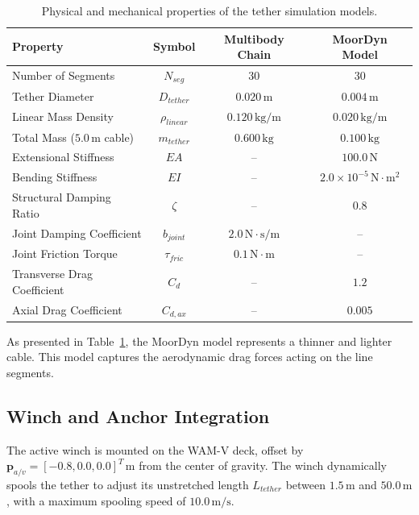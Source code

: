     \begin{table}[htbp]
        \centering
        \caption{Physical and mechanical properties of the tether simulation models.}
        \label{tab:tether_parameters}
        \begin{tabular}{lccc}
            \toprule
            \textbf{Property} & \textbf{Symbol} & \textbf{Multibody Chain} & \textbf{MoorDyn Model} \\
            \midrule
            Number of Segments & $N_{seg}$ & $30$ & $30$ \\
            Tether Diameter & $D_{tether}$ & $0.020\,\text{m}$ & $0.004\,\text{m}$ \\
            Linear Mass Density & $\rho_{linear}$ & $0.120\,\text{kg/m}$ & $0.020\,\text{kg/m}$ \\
            Total Mass ($5.0\,\text{m}$ cable) & $m_{tether}$ & $0.600\,\text{kg}$ & $0.100\,\text{kg}$ \\
            Extensional Stiffness & $EA$ & -- & $100.0\,\text{N}$ \\
            Bending Stiffness & $EI$ & -- & $2.0 \times 10^{-5}\,\text{N}\cdot\text{m}^2$ \\
            Structural Damping Ratio & $\zeta$ & -- & $0.8$ \\
            Joint Damping Coefficient & $b_{joint}$ & $2.0\,\text{N}\cdot\text{s/m}$ & -- \\
            Joint Friction Torque & $\tau_{fric}$ & $0.1\,\text{N}\cdot\text{m}$ & -- \\
            Transverse Drag Coefficient & $C_d$ & -- & $1.2$ \\
            Axial Drag Coefficient & $C_{d,ax}$ & -- & $0.005$ \\
            \bottomrule
        \end{tabular}
    \end{table}

    As presented in Table~\ref{tab:tether_parameters}, the MoorDyn model represents a thinner and lighter cable. This model captures the aerodynamic drag forces acting on the line segments.

    \subsection{Winch and Anchor Integration}
    The active winch is mounted on the WAM-V deck, offset by $\mathbf{p}_{a/v} = [-0.8, 0.0, 0.0]^T\,\text{m}$ from the center of gravity. The winch dynamically spools the tether to adjust its unstretched length $L_{tether}$ between $1.5\,\text{m}$ and $50.0\,\text{m}$, with a maximum spooling speed of $10.0\,\text{m/s}$.
    
